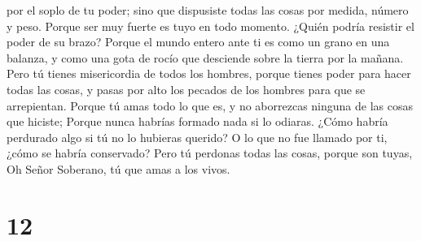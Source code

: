 por el soplo de tu poder; sino que dispusiste todas las cosas por
medida, número y peso.  Porque ser muy fuerte es tuyo en
todo momento. ¿Quién podría resistir el poder de su brazo?
 Porque el mundo entero ante ti es como un grano en una
balanza, y como una gota de rocío que desciende sobre la tierra por la
mañana.  Pero tú tienes misericordia de todos los
hombres, porque tienes poder para hacer todas las cosas, y pasas por
alto los pecados de los hombres para que se arrepientan. 
Porque tú amas todo lo que es, y no aborrezcas ninguna de las cosas que
hiciste; Porque nunca habrías formado nada si lo odiaras.
 ¿Cómo habría perdurado algo si tú no lo hubieras
querido? O lo que no fue llamado por ti, ¿cómo se habría conservado?
 Pero tú perdonas todas las cosas, porque son tuyas, Oh
Señor Soberano, tú que amas a los vivos.

\hypertarget{section-11}{%
\section{12}\label{section-11}}

